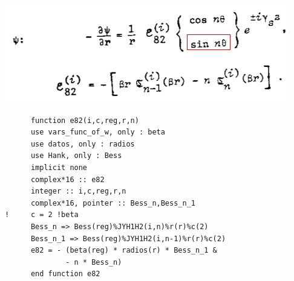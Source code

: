 \documentclass [11pt,spanish]{article}
\begin{document}
\endgroup
\includegraphics[scale=0.5]{e82}
\begingroup
\fontsize{10pt}{12pt}
\selectfont
{}
\begin{shaded}
\begin{verbatim}
      function e82(i,c,reg,r,n)
      use vars_func_of_w, only : beta
      use datos, only : radios
      use Hank, only : Bess
      implicit none
      complex*16 :: e82
      integer :: i,c,reg,r,n
      complex*16, pointer :: Bess_n,Bess_n_1
!     c = 2 !beta
      Bess_n => Bess(reg)%JYH1H2(i,n)%r(r)%c(2)
      Bess_n_1 => Bess(reg)%JYH1H2(i,n-1)%r(r)%c(2)
      e82 = - (beta(reg) * radios(r) * Bess_n_1 & 
              - n * Bess_n)
      end function e82
\end{verbatim}
\end{shaded}
\endgroup
\end{document}
